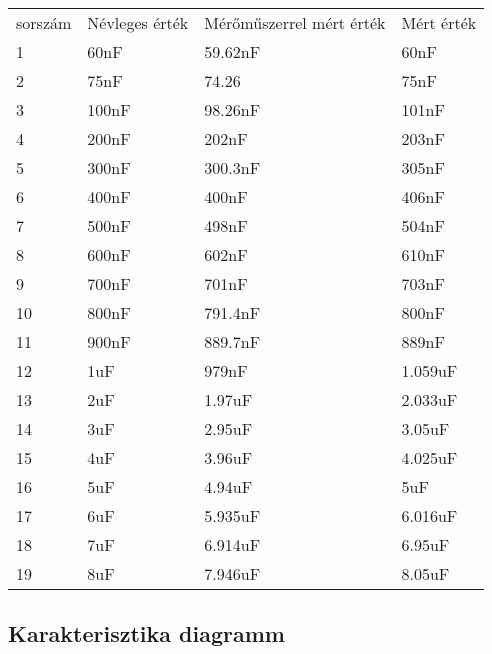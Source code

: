 \begin{table}[]
    \begin{tabular}{llll}
    sorszám & Névleges érték & Mérőműszerrel mért érték & Mért érték \\
    1       & 60nF           & 59.62nF                  & 60nF       \\
    2       & 75nF           & 74.26                    & 75nF       \\
    3       & 100nF          & 98.26nF                  & 101nF      \\
    4       & 200nF          & 202nF                    & 203nF      \\
    5       & 300nF          & 300.3nF                  & 305nF      \\
    6       & 400nF          & 400nF                    & 406nF      \\
    7       & 500nF          & 498nF                    & 504nF      \\
    8       & 600nF          & 602nF                    & 610nF      \\
    9       & 700nF          & 701nF                    & 703nF      \\
    10      & 800nF          & 791.4nF                  & 800nF      \\
    11      & 900nF          & 889.7nF                  & 889nF      \\
    12      & 1uF            & 979nF                    & 1.059uF    \\
    13      & 2uF            & 1.97uF                   & 2.033uF    \\
    14      & 3uF            & 2.95uF                   & 3.05uF     \\
    15      & 4uF            & 3.96uF                   & 4.025uF    \\
    16      & 5uF            & 4.94uF                   & 5uF        \\
    17      & 6uF            & 5.935uF                  & 6.016uF    \\
    18      & 7uF            & 6.914uF                  & 6.95uF     \\
    19      & 8uF            & 7.946uF                  & 8.05uF    
\end{tabular}
\end{table}

\subsection{Karakterisztika diagramm}

